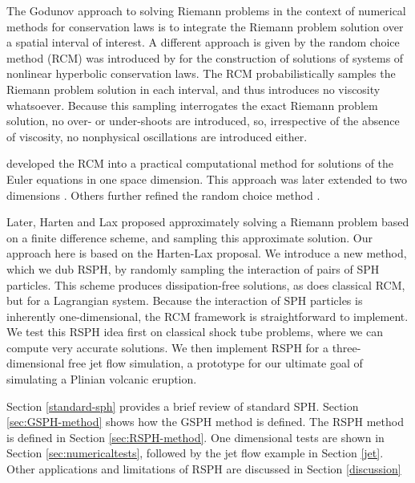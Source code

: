 \documentclass[review]{elsarticle}
\begin{document}
The Godunov approach to solving Riemann problems in the context of numerical methods for conservation laws is to integrate the Riemann problem solution over a spatial interval of interest. A different approach is given by the random choice method (RCM) was introduced by \citet{glimm1965solutions} for the construction of solutions of systems of nonlinear hyperbolic conservation laws. The RCM probabilistically samples the Riemann problem solution in each interval, and thus introduces no viscosity whatsoever. Because this sampling interrogates the exact Riemann problem solution, no over- or under-shoots are introduced, so, irrespective of the absence of viscosity, no nonphysical oscillations are introduced either.


\citet{chorin1976random} developed the RCM into a practical computational method for solutions of the Euler equations in one space dimension. This approach was later extended to two dimensions \cite{chorinporousmedium}. Others further refined the random choice method \citep{sod1977numerical,concus1979numerical,colella1982glimm, freistuhler1992numerical,toro2013riemann}. 

Later, Harten and Lax \cite{hartenlax} proposed approximately solving a Riemann problem based on a finite difference scheme, and sampling this approximate solution. Our approach here is based on the Harten-Lax proposal. We introduce a new method, which we dub RSPH, by randomly sampling the interaction of pairs of SPH particles. This scheme produces dissipation-free solutions, as does classical RCM, but for a Lagrangian system. Because the interaction of SPH particles is inherently one-dimensional, the RCM framework is straightforward to implement. We test this RSPH idea first on classical shock tube problems, where we can compute very accurate solutions.
We then implement RSPH for a three-dimensional free jet flow simulation, a prototype for our ultimate goal of simulating a Plinian volcanic eruption.

Section \ref{standard-sph} provides a brief review of standard SPH. Section \ref{sec:GSPH-method} shows how the GSPH method is defined. The RSPH method is defined in Section \ref{sec:RSPH-method}.
One dimensional tests are shown in Section \ref{sec:numericaltests}, followed by the jet flow example in Section \ref{jet}. Other applications and limitations of RSPH are discussed in Section \ref{discussion}
\end{document}
